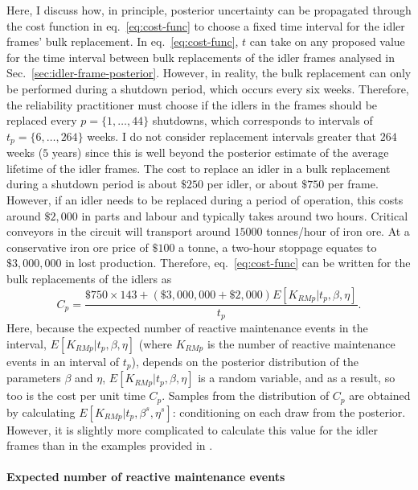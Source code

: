 Here, I discuss how, in principle, posterior uncertainty can be propagated through the cost function in eq.~\eqref{eq:cost-func} to choose a fixed time interval for the idler frames' bulk replacement. In eq.~\eqref{eq:cost-func}, $t$ can take on any proposed value for the time interval between bulk replacements of the idler frames analysed in Sec.~\ref{sec:idler-frame-posterior}. However, in reality, the bulk replacement can only be performed during a shutdown period, which occurs every six weeks. Therefore, the reliability practitioner must choose if the idlers in the frames should be replaced every $p = \{1,\dots, 44\}$ shutdowns, which corresponds to intervals of $t_p = \{6, \dots, 264\}$ weeks. I do not consider replacement intervals greater that $264$ weeks ($5$ years) since this is well beyond the posterior estimate of the average lifetime of the idler frames. The cost to replace an idler in a bulk replacement during a shutdown period is about $\$250$ per idler, or about $\$750$ per frame. However, if an idler needs to be replaced during a period of operation, this costs around $\$2{,}000$ in parts and labour and typically takes around two hours. Critical conveyors in the circuit will transport around $15000$ tonnes/hour of iron ore. At a conservative iron ore price of $\$100$ a tonne, a two-hour stoppage equates to $\$3{,}000{,}000$ in lost production. Therefore, eq.~\eqref{eq:cost-func} can be written for the bulk replacements of the idlers as
\begin{equation}
  \label{eq:cost-func-idlers}
 C_p = \frac{\$750 \times 143 + (\$3{,}000{,}000 + \$2{,}000) E[K_{RM p}|t_p,\beta,\eta]}{t_p}.
\end{equation}
Here, because the expected number of reactive maintenance events in the interval, $E[K_{RM p}|t_p,\beta,\eta]$ (where $K_{RM p}$ is the number of reactive maintenance events in an interval of $t_p$), depends on the posterior distribution of the parameters $\beta$ and $\eta$, $E[K_{RM p}|t_p,\beta,\eta]$ is a random variable, and as a result, so too is the cost per unit time $C_p$. Samples from the distribution of $C_p$ are obtained by calculating $E[K_{RM p}|t_p,\beta^s,\eta^s]$: conditioning on each draw from the posterior. However, it is slightly more complicated to calculate this value for the idler frames than in the examples provided in \citet{jardine2013}.

\paragraph*{Expected number of reactive maintenance events}

